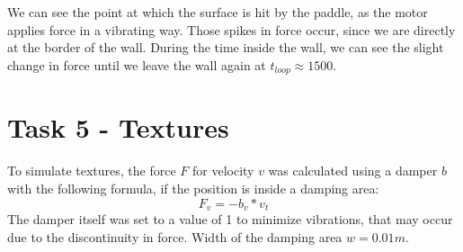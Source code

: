   \begin{figure}[H]
    \centering
  \end{figure}

  We can see the point at which the surface is hit by the paddle, as the motor applies force in a vibrating way. Those spikes in force occur, since we are directly at the border of the wall. During the time inside the wall, we can see the slight change in force until we leave the wall again at $t_{loop} \approx 1500$.

  \section*{Task 5 - Textures}

  To simulate textures, the force $F$ for velocity $v$ was calculated using a damper $b$ with the following formula, if the position is inside a damping area:
  \begin{equation*}
    F_{v} = -b_{v} * v_{t}
  \end{equation*}
  The damper itself was set to a value of 1 to minimize vibrations, that may occur due to the discontinuity in force. Width of the damping area $w = 0.01m$.

